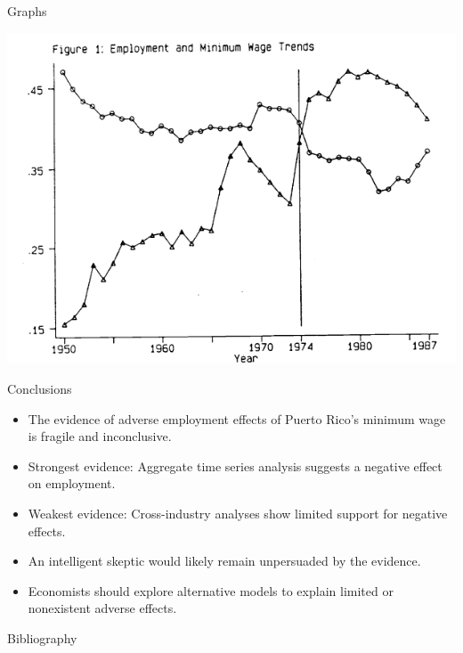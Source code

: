 \documentclass[12pt]{beamer}
\begin{document}
\begin{frame}[allowframebreaks]{Graphs}
	\begin{center}
		\includegraphics[width=0.8\linewidth]{assets/graph.png}
	\end{center}
\end{frame}

\begin{frame}[allowframebreaks]{Conclusions}
	\begin{itemize}
		\item The evidence of adverse employment effects of Puerto Rico's minimum wage is fragile and inconclusive.
		\item Strongest evidence: Aggregate time series analysis suggests a negative effect on employment.
		\item Weakest evidence: Cross-industry analyses show limited support for negative effects.
		\item An intelligent skeptic would likely remain unpersuaded by the evidence.
		\item Economists should explore alternative models to explain limited or nonexistent adverse effects.
	\end{itemize}
\end{frame}
\begin{frame}[allowframebreaks]{Bibliography}
	\printbibliography
\end{frame}
\end{document}
